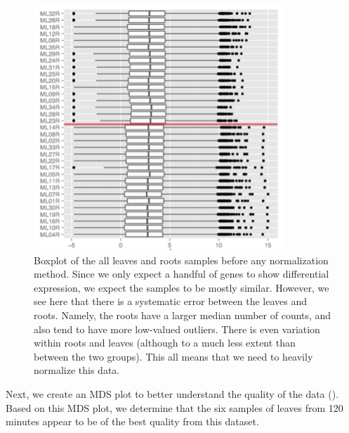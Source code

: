 \documentclass[11pt,a4paper,oldfontcommands,openany]{memoir}
\numberwithin{equation}{section} %
\begin{document}
\begin{figure}[H]
    \centering
    \includegraphics[width=\textwidth]{needNorm}
    \caption{Boxplot of the all leaves and roots samples before any normalization method. Since we only expect a handful of genes to show differential expression, we expect the samples to be mostly similar. However, we see here that there is a systematic error between the leaves and roots. Namely, the roots have a larger median number of counts, and also tend to have more low-valued outliers. There is even variation within roots and leaves (although to a much less extent than between the two groups). This all means that we need to heavily normalize this data.}
    \label{fig:needNorm}
\end{figure}

Next, we create an MDS plot to better understand the quality of the data (\citealt{limma}). Based on this MDS plot, we determine that the six samples of leaves from 120 minutes appear to be of the best quality from this dataset.
\end{document}
